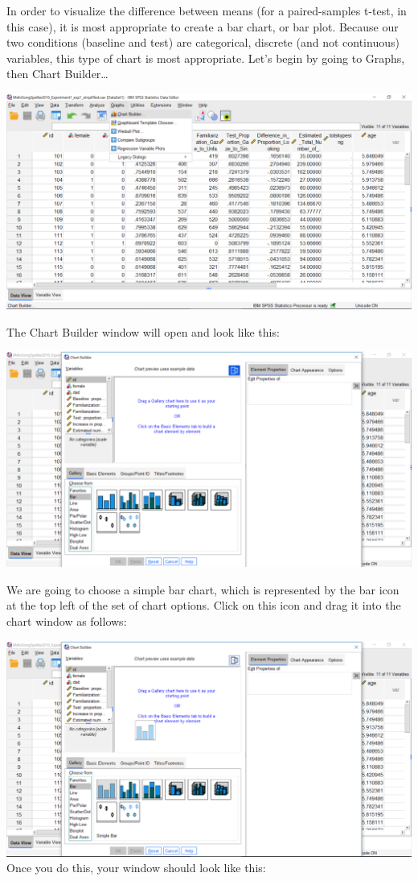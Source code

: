 \documentclass[]{book}
\begin{document}
In order to visualize the difference between means (for a paired-samples
t-test, in this case), it is most appropriate to create a bar chart, or
bar plot. Because our two conditions (baseline and test) are
categorical, discrete (and not continuous) variables, this type of chart
is most appropriate. Let's begin by going to {Graphs}, then {Chart
Builder\ldots{}}

\includegraphics{img/6.4.20.png}

The Chart Builder window will open and look like this:

\includegraphics{img/6.4.21.png}

We are going to choose a simple bar chart, which is represented by the
bar icon at the top left of the set of chart options. Click on this icon
and drag it into the chart window as follows:

\includegraphics{img/6.4.22.png} Once you do this, your window should
look like this:
\end{document}
